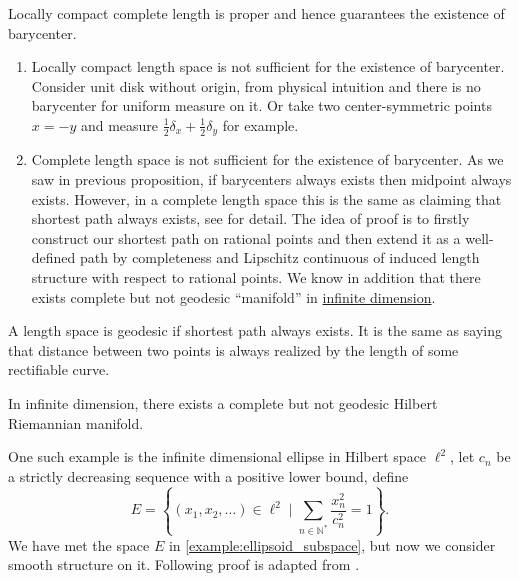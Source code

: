 \begin{example}
	Locally compact complete length is proper and hence guarantees the existence of barycenter.
	\begin{enumerate}
		\item Locally compact length space is not sufficient for the existence of barycenter.
		      Consider unit disk without origin,
		      from physical intuition and there is no barycenter for uniform measure on it.
		      Or take two center-symmetric points $x = - y$ and measure $\frac{1}{2}\delta_x + \frac{1}{2}\delta_y$ for example.
		\item Complete length space is not sufficient for the existence of barycenter.
		      As we saw in previous proposition, if barycenters always exists then midpoint always exists.
		      However, in a complete length space this is the same as claiming that shortest path always exists,
		      see \cite[Theorem 2.4.16]{burago2001course} for detail.
		      The idea of proof is to firstly construct our shortest path on rational points and then extend it
		      as a well-defined path by completeness and Lipschitz continuous of induced length structure with respect to rational points.
		      We know in addition that there exists complete but not geodesic ``manifold'' in \underline{infinite dimension}.
	\end{enumerate}
\end{example}

A length space is geodesic if shortest path always exists.
It is the same as saying that distance between two points is always realized by the length of some rectifiable curve.

\begin{lem}
	In infinite dimension, there exists a complete but not geodesic Hilbert Riemannian manifold.
\end{lem}

One such example is the infinite dimensional ellipse in Hilbert space $\ell^2$, let $c_n$ be a strictly decreasing sequence with a positive lower bound, define
\[
	E = \left\{ \left( x _ { 1 } , x _ { 2 } , \ldots \right) \in \ell^2 \mid \sum _ { n \in \mathbb { N }^* } \frac { x _ { n } ^ { 2 } } { c _ { n } ^ { 2 } } = 1 \right\}.
\]
We have met the space $E$ in \cref{example:ellipsoid_subspace},
but now we consider smooth structure on it.
Following proof is adapted from \cite[Example 5.1]{grossman1965hilbert}.

